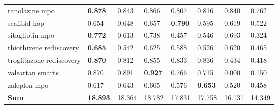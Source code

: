\begin{sidewaystable}[ht]
\begin{tabularx}{\linewidth}{l|Y Y Y Y Y Y Y }
\small{ranolazine mpo} & \textbf{0.878} & 0.843 & 0.866 & 0.807 & 0.816 & 0.840 & 0.762 \\
\small{scaffold hop} & 0.654 & 0.648 & 0.657 & \textbf{0.790} & 0.595 & 0.619 & 0.522 \\
\small{sitagliptin mpo} & \textbf{0.772} & 0.613 & 0.738 & 0.457 & 0.546 & 0.693 & 0.324 \\
\small{thiothixene rediscovery} & \textbf{0.685} & 0.542 & 0.625 & 0.588 & 0.526 & 0.620 & 0.465 \\
\small{troglitazone rediscovery} & \textbf{0.870} & 0.812 & 0.855 & 0.833 & 0.836 & 0.434 & 0.418 \\
\small{valsartan smarts} & 0.870 & 0.891 & \textbf{0.927} & 0.766 & 0.715 & 0.000 & 0.150 \\
\small{zaleplon mpo} & 0.617 & 0.643 & 0.605 & 0.576 & \textbf{0.653} & 0.520 & 0.458 \\
\midrule
\textbf{Sum} & \textbf{18.893} & 18.364 & 18.782 & 17.831 & 17.758 & 16.131 & 14.349 \\
\bottomrule
\end{tabularx}
\end{sidewaystable}